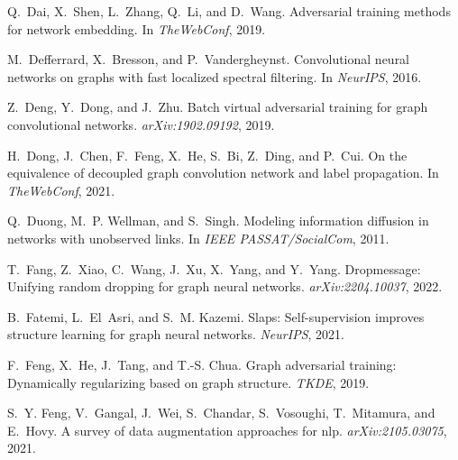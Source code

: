 \documentclass[11pt]{article}
\begin{document}
\begin{thebibliography}{10}
\begin{small}
Q.~Dai, X.~Shen, L.~Zhang, Q.~Li, and D.~Wang.
\newblock Adversarial training methods for network embedding.
\newblock In \emph{TheWebConf}, 2019.

M.~Defferrard, X.~Bresson, and P.~Vandergheynst.
\newblock Convolutional neural networks on graphs with fast localized spectral
  filtering.
\newblock In \emph{NeurIPS}, 2016.

Z.~Deng, Y.~Dong, and J.~Zhu.
\newblock Batch virtual adversarial training for graph convolutional networks.
\newblock \emph{arXiv:1902.09192}, 2019.

H.~Dong, J.~Chen, F.~Feng, X.~He, S.~Bi, Z.~Ding, and P.~Cui.
\newblock On the equivalence of decoupled graph convolution network and label
  propagation.
\newblock In \emph{TheWebConf}, 2021.

Q.~Duong, M.~P. Wellman, and S.~Singh.
\newblock Modeling information diffusion in networks with unobserved links.
\newblock In \emph{IEEE PASSAT/SocialCom}, 2011.

T.~Fang, Z.~Xiao, C.~Wang, J.~Xu, X.~Yang, and Y.~Yang.
\newblock Dropmessage: Unifying random dropping for graph neural networks.
\newblock \emph{arXiv:2204.10037}, 2022.

B.~Fatemi, L.~El~Asri, and S.~M. Kazemi.
\newblock Slaps: Self-supervision improves structure learning for graph neural
  networks.
\newblock \emph{NeurIPS}, 2021.

F.~Feng, X.~He, J.~Tang, and T.-S. Chua.
\newblock Graph adversarial training: Dynamically regularizing based on graph
  structure.
\newblock \emph{TKDE}, 2019.

S.~Y. Feng, V.~Gangal, J.~Wei, S.~Chandar, S.~Vosoughi, T.~Mitamura, and
  E.~Hovy.
\newblock A survey of data augmentation approaches for nlp.
\newblock \emph{arXiv:2105.03075}, 2021.


\end{small}
\end{thebibliography}
\end{document}

